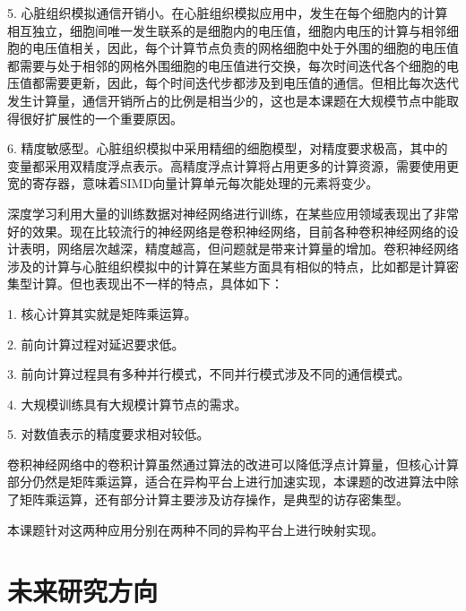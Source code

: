 \begin{compactitem}
\item[5.]
心脏组织模拟通信开销小。在心脏组织模拟应用中，发生在每个细胞内的计算相互独立，细胞间唯一发生联系的是细胞内的电压值，细胞内电压的计算与相邻细胞的电压值相关，因此，每个计算节点负责的网格细胞中处于外围的细胞的电压值都需要与处于相邻的网格外围细胞的电压值进行交换，每次时间迭代各个细胞的电压值都需要更新，因此，每个时间迭代步都涉及到电压值的通信。但相比每次迭代发生计算量，通信开销所占的比例是相当少的，这也是本课题在大规模节点中能取得很好扩展性的一个重要原因。

\item[6.]
精度敏感型。心脏组织模拟中采用精细的细胞模型，对精度要求极高，其中的变量都采用双精度浮点表示。高精度浮点计算将占用更多的计算资源，需要使用更宽的寄存器，意味着SIMD向量计算单元每次能处理的元素将变少。

\end{compactitem}

深度学习利用大量的训练数据对神经网络进行训练，在某些应用领域表现出了非常好的效果。现在比较流行的神经网络是卷积神经网络，目前各种卷积神经网络的设计表明，网络层次越深，精度越高，但问题就是带来计算量的增加。卷积神经网络涉及的计算与心脏组织模拟中的计算在某些方面具有相似的特点，比如都是计算密集型计算。但也表现出不一样的特点，具体如下：
\begin{compactitem}
\item[1.]核心计算其实就是矩阵乘运算。

\item[2.]前向计算过程对延迟要求低。

\item[3.]前向计算过程具有多种并行模式，不同并行模式涉及不同的通信模式。

\item[4.]大规模训练具有大规模计算节点的需求。

\item[5.]对数值表示的精度要求相对较低。
\end{compactitem}

卷积神经网络中的卷积计算虽然通过算法的改进可以降低浮点计算量，但核心计算部分仍然是矩阵乘运算，适合在异构平台上进行加速实现，本课题的改进算法中除了矩阵乘运算，还有部分计算主要涉及访存操作，是典型的访存密集型。

本课题针对这两种应用分别在两种不同的异构平台上进行映射实现。

\section{未来研究方向}



